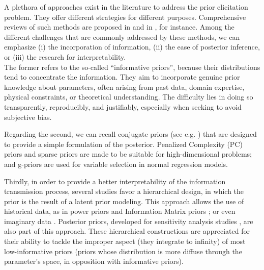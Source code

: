 A plethora of approaches exist in the literature to address the prior elicitation problem. They offer different strategies for different purposes. 
Comprehensive reviews of such methods are proposed in \cite{mikkola_prior_2023}
and in \cite{consonni_prior_2018}, for instance.
Among the different challenges that are commonly addressed by these methods, we can emphasize (i) the incorporation of information, (ii) the ease of posterior inference, or (iii) the research for interpretability.\\
The former refers to the so-called ``informative priors'', because their distributions tend to concentrate the information. %
They aim to incorporate genuine prior knowledge about parameters, often arising from past data, domain expertise, physical constraints, or theoretical understanding. %
The difficulty lies in doing so transparently, reproducibly, and justifiably, especially when seeking to avoid subjective bias.

Regarding the second, we can recall conjugate priors (see e.g. \cite{robert_bayesian_2007}) that are designed to provide a simple formulation of the posterior. Penalized Complexity (PC) priors \citep{simpson_penalising_2017} and sparse priors \citep{castillo_bayesian_2015} are made to be suitable for high-dimensional problems; and g-priors \citep{liang_mixtures_2008} are used for variable selection in normal regression models.

Thirdly, in order to provide a better interpretability of the information transmission process, several studies favor a hierarchical design, in which the prior is the result of a latent prior modeling. This approach allows the use of historical data, as in power priors \citep{chen_relationship_2006} and Information Matrix priors \citep{gupta_information_2009}; or even imaginary data \citep{perez_expectedposterior_2002,spitzner_neutral-data_2011}. Posterior priors, developed for sensitivity analysis studies \citep{bousquet_discussion_2024}, are also part of this approach. %
These hierarchical constructions are appreciated for their ability to tackle the improper aspect (they integrate to infinity) of most low-informative priors
(priors whose distribution is more diffuse through the parameter's space, in opposition with informative priors).\\



